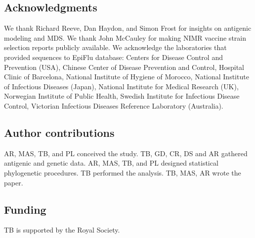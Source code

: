 \documentclass[11pt,oneside,letterpaper]{article}
\begin{document}
\subsection*{Acknowledgments} 

We thank Richard Reeve, Dan Haydon, and Simon Frost for insights on antigenic modeling and MDS.
We thank John McCauley for making NIMR vaccine strain selection reports publicly available.
We acknowledge the laboratories that provided sequences to EpiFlu database: Centers for Disease Control and Prevention (USA), Chinese Center of Disease Prevention and Control, Hospital Clinic of Barcelona, National Institute of Hygiene of Morocco, National Institute of Infectious Diseases (Japan), National Institute for Medical Research (UK), Norwegian Institute of Public Health, Swedish Institute for Infectious Disease Control, Victorian Infectious Diseases Reference Laboratory (Australia).

\subsection*{Author contributions} 

AR, MAS, TB, and PL conceived the study.
TB, GD, CR, DS and AR gathered antigenic and genetic data.
AR, MAS, TB, and PL designed statistical phylogenetic procedures.
TB performed the analysis.
TB, MAS, AR wrote the paper.

\subsection*{Funding} 

TB is supported by the Royal Society.






\end{document}
